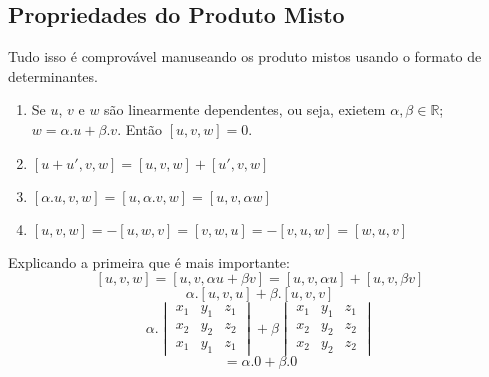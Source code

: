 \documentclass[ ]{article}
\begin{document}
		\subsection{Propriedades do Produto Misto}
			Tudo isso é comprovável manuseando os produto mistos usando o formato de determinantes.
			\begin{enumerate}
				\item Se $u$, $v$ e $w$ são linearmente dependentes, ou seja, exietem $ \alpha, \beta \in \mathbb{R}$; $w=\alpha.u + \beta.v$. Então $[u,v,w]=0$.
				\item $[u+u',v,w] = [u,v,w]+[u',v,w]$
				\item $[\alpha . u,v,w] = [u,\alpha .v, w] = [u,v, \alpha w]$
				\item $ [u,v,w] = -[u,w,v]=[v,w,u]=-[v,u,w]=[w,u,v]$ %
			\end{enumerate}
			Explicando a primeira que é mais importante:
			$$[u,v,w]=[u,v,\alpha u +\beta v] = [u,v,\alpha u]+[u,v,\beta v]$$
			$$\alpha.[u,v,u]+\beta.[u,v,v]$$
			$$
				\alpha.
				\begin{vmatrix}
					x_1&y_1&z_1\\
					x_2&y_2&z_2\\
					x_1&y_1&z_1
				\end{vmatrix}		
				+ \beta
				\begin{vmatrix}
					x_1&y_1&z_1\\
					x_2&y_2&z_2\\
					x_2&y_2&z_2
				\end{vmatrix}								
			$$
			$$= \alpha . 0 + \beta.0$$
\end{document}
